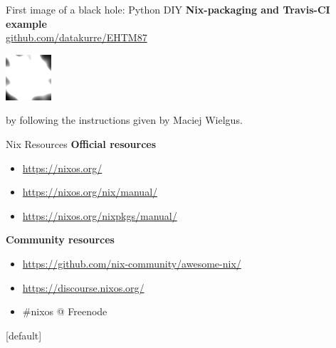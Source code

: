 \documentclass[10pt,aspectratio=169]{beamer}
\begin{document}

\begin{frame}[fragile]{First image of a black hole: Python DIY }
\textbf{Nix-packaging and Travis-CI example}\\
\href{https://github.com/datakurre/EHTM87/}{github.com/datakurre/EHTM87}
\par
\includegraphics[width=0.20\paperwidth]{images/M87.png}
\par
by following the instructions given by Maciej Wielgus.
\end{frame}


\begin{frame}{Nix Resources}
  \textbf{Official resources}
  \begin{itemize}
    \item \href{https://nixos.org/}{https://nixos.org/}
    \item \href{https://nixos.org/nix/manual/}{https://nixos.org/nix/manual/}
    \item \href{https://nixos.org/nixpkgs/manual/}{https://nixos.org/nixpkgs/manual/}
  \end{itemize}
  \textbf{Community resources}
  \begin{itemize}
    \item \href{https://github.com/nix-community/awesome-nix/}{https://github.com/nix-community/awesome-nix/}
    \item \href{https://discourse.nixos.org/}{https://discourse.nixos.org/}
    \item \#nixos @ Freenode
  \end{itemize}
\end{frame}


[default]
\end{document}

